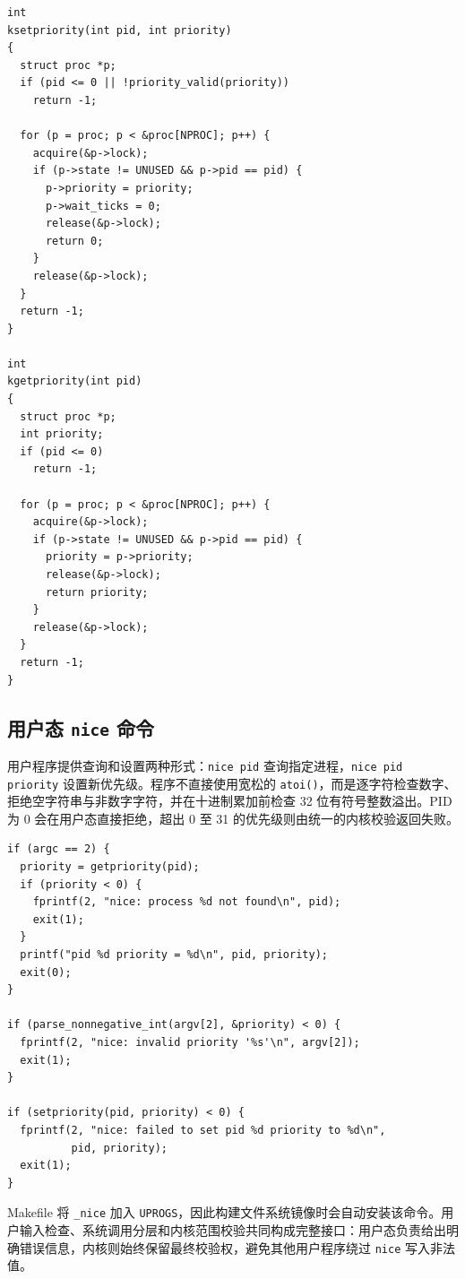 \begin{lstlisting}[caption={内核优先级读写接口（\texttt{kernel/proc.c}）},label={lst:priority-kernel-api}]
int
ksetpriority(int pid, int priority)
{
  struct proc *p;
  if (pid <= 0 || !priority_valid(priority))
    return -1;

  for (p = proc; p < &proc[NPROC]; p++) {
    acquire(&p->lock);
    if (p->state != UNUSED && p->pid == pid) {
      p->priority = priority;
      p->wait_ticks = 0;
      release(&p->lock);
      return 0;
    }
    release(&p->lock);
  }
  return -1;
}

int
kgetpriority(int pid)
{
  struct proc *p;
  int priority;
  if (pid <= 0)
    return -1;

  for (p = proc; p < &proc[NPROC]; p++) {
    acquire(&p->lock);
    if (p->state != UNUSED && p->pid == pid) {
      priority = p->priority;
      release(&p->lock);
      return priority;
    }
    release(&p->lock);
  }
  return -1;
}
\end{lstlisting}

\subsection{用户态 \texttt{nice} 命令}

用户程序提供查询和设置两种形式：\texttt{nice pid} 查询指定进程，\texttt{nice pid priority} 设置新优先级。程序不直接使用宽松的 \texttt{atoi()}，而是逐字符检查数字、拒绝空字符串与非数字字符，并在十进制累加前检查 32 位有符号整数溢出。PID 为 0 会在用户态直接拒绝，超出 0 至 31 的优先级则由统一的内核校验返回失败。

\begin{lstlisting}[caption={\texttt{nice} 命令的查询与设置分支（\texttt{user/nice.c}）},label={lst:nice-command}]
if (argc == 2) {
  priority = getpriority(pid);
  if (priority < 0) {
    fprintf(2, "nice: process %d not found\n", pid);
    exit(1);
  }
  printf("pid %d priority = %d\n", pid, priority);
  exit(0);
}

if (parse_nonnegative_int(argv[2], &priority) < 0) {
  fprintf(2, "nice: invalid priority '%s'\n", argv[2]);
  exit(1);
}

if (setpriority(pid, priority) < 0) {
  fprintf(2, "nice: failed to set pid %d priority to %d\n",
          pid, priority);
  exit(1);
}
\end{lstlisting}

Makefile 将 \texttt{\_nice} 加入 \texttt{UPROGS}，因此构建文件系统镜像时会自动安装该命令。用户输入检查、系统调用分层和内核范围校验共同构成完整接口：用户态负责给出明确错误信息，内核则始终保留最终校验权，避免其他用户程序绕过 \texttt{nice} 写入非法值。

